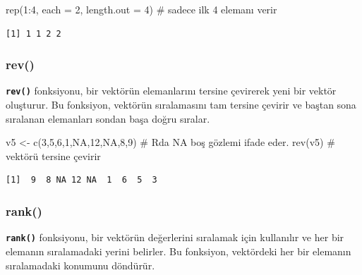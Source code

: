 \documentclass[
  letterpaper,
  DIV=11,
  numbers=noendperiod]{scrreprt}
\newenvironment{Shaded}{\begin{snugshade}}{\end{snugshade}}
\newcommand{\AttributeTok}[1]{\textcolor[rgb]{0.40,0.45,0.13}{#1}}
\newcommand{\CommentTok}[1]{\textcolor[rgb]{0.37,0.37,0.37}{#1}}
\newcommand{\ConstantTok}[1]{\textcolor[rgb]{0.56,0.35,0.01}{#1}}
\newcommand{\DecValTok}[1]{\textcolor[rgb]{0.68,0.00,0.00}{#1}}
\newcommand{\FunctionTok}[1]{\textcolor[rgb]{0.28,0.35,0.67}{#1}}
\newcommand{\NormalTok}[1]{\textcolor[rgb]{0.00,0.23,0.31}{#1}}
\newcommand{\OtherTok}[1]{\textcolor[rgb]{0.00,0.23,0.31}{#1}}
\newcommand{\SpecialCharTok}[1]{\textcolor[rgb]{0.37,0.37,0.37}{#1}}
\begin{document}
\begin{Shaded}
\begin{Highlighting}[]
\FunctionTok{rep}\NormalTok{(}\DecValTok{1}\SpecialCharTok{:}\DecValTok{4}\NormalTok{, }\AttributeTok{each =} \DecValTok{2}\NormalTok{, }\AttributeTok{length.out =} \DecValTok{4}\NormalTok{) }\CommentTok{\# sadece ilk 4 elemanı verir}
\end{Highlighting}
\end{Shaded}

\begin{verbatim}
[1] 1 1 2 2
\end{verbatim}

\hypertarget{rev}{%
\subsubsection{rev()}\label{rev}}

\textbf{\texttt{rev()}} fonksiyonu, bir vektörün elemanlarını tersine
çevirerek yeni bir vektör oluşturur. Bu fonksiyon, vektörün sıralamasını
tam tersine çevirir ve baştan sona sıralanan elemanları sondan başa
doğru sıralar.

\begin{Shaded}
\begin{Highlighting}[]
\NormalTok{v5 }\OtherTok{\textless{}{-}} \FunctionTok{c}\NormalTok{(}\DecValTok{3}\NormalTok{,}\DecValTok{5}\NormalTok{,}\DecValTok{6}\NormalTok{,}\DecValTok{1}\NormalTok{,}\ConstantTok{NA}\NormalTok{,}\DecValTok{12}\NormalTok{,}\ConstantTok{NA}\NormalTok{,}\DecValTok{8}\NormalTok{,}\DecValTok{9}\NormalTok{) }\CommentTok{\# R\textquotesingle{}da NA boş gözlemi ifade eder.}
\FunctionTok{rev}\NormalTok{(v5) }\CommentTok{\# vektörü tersine çevirir}
\end{Highlighting}
\end{Shaded}

\begin{verbatim}
[1]  9  8 NA 12 NA  1  6  5  3
\end{verbatim}

\hypertarget{rank}{%
\subsubsection{rank()}\label{rank}}

\textbf{\texttt{rank()}} fonksiyonu, bir vektörün değerlerini sıralamak
için kullanılır ve her bir elemanın sıralamadaki yerini belirler. Bu
fonksiyon, vektördeki her bir elemanın sıralamadaki konumunu döndürür.
\end{document}
